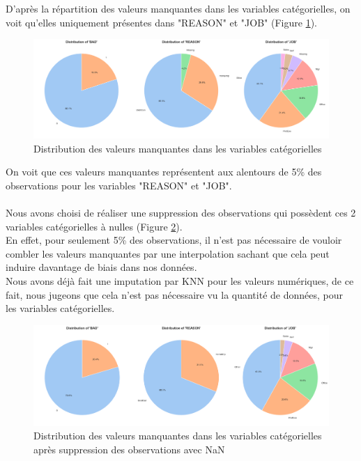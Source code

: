 \documentclass[a4paper,12pt]{report}
\begin{document}
D'après la répartition des valeurs manquantes dans les variables catégorielles, on voit qu'elles 
uniquement présentes dans "REASON" et "JOB" (Figure \ref{fig:dist_missing_values_cat}).

\pagebreak

\begin{figure}[h!]
  \includegraphics[width=\textwidth]{../images/piechart_valeurs_manquantes_var_categorial}
  \caption{Distribution des valeurs manquantes dans les variables catégorielles}
  \label{fig:dist_missing_values_cat}
\end{figure}

On voit que ces valeurs manquantes représentent aux alentours de 5\% des observations pour les variables "REASON" et "JOB".\\
\\
Nous avons choisi de réaliser une suppression des observations qui possèdent ces 2 variables catégorielles à nulles (Figure \ref{fig:dist_missing_values_cat_dropna}).\\
En effet, pour seulement 5\% des observations, il n'est pas nécessaire de vouloir combler les valeurs manquantes par une interpolation
sachant que cela peut induire davantage de biais dans nos données.\\
Nous avons déjà fait une imputation par KNN pour les valeurs numériques, de ce fait, nous jugeons que cela n'est pas nécessaire vu la quantité de données,
pour les variables catégorielles.

\begin{figure}[h!]
  \includegraphics[width=\textwidth]{../images/piechart_valeurs_manquantes_var_categorial_dropna}
  \caption{Distribution des valeurs manquantes dans les variables catégorielles après suppression des observations avec NaN}
  \label{fig:dist_missing_values_cat_dropna}
\end{figure}
\end{document}
